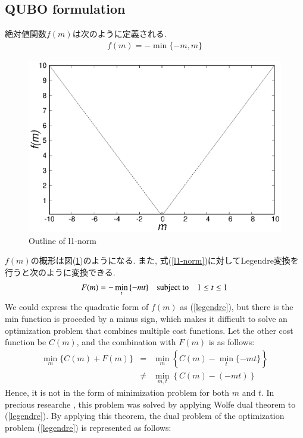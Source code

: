 \documentclass[fp,twocolumn]{jpsj3}
\begin{document}
\subsection{QUBO formulation}
絶対値関数$f(m)$は次のように定義される.
\begin{eqnarray}
  f(m)=-\min{\{-m,m\}} \label{l1-norm}
\end{eqnarray}
\begin{figure}[htbp]
  \begin{center}
    \includegraphics[keepaspectratio,scale=0.50]{absolute.eps}
    \caption{Outline of l1-norm}
    \label{fig:absolute}
  \end{center}
\end{figure}
$f(m)$の概形は図(\ref{fig:absolute})のようになる. また, 式(\ref{l1-norm})に対してLegendre変換を行うと次のように変換できる. 
\begin{eqnarray}
  F(m)=-\min_{t}{\{-mt\}} \quad \text{subject to} \quad \-1 \leq t \leq 1 \label{legendre}
\end{eqnarray}
We could express the quadratic form of $f(m)$ as (\ref{legendre}), but there is the min function is proceded by a minus sign, which makes it difficult to solve an optimization problem that combines multiple cost functions. Let the other cost function be $C(m)$, and the combination with $F(m)$ is as follows:
\begin{eqnarray}
  \min_{m}{\{C(m)+F(m)\}} &=& \min_{m}\left\{C(m)-\min_{t}{\{-mt\}}\right\} \nonumber \\
  &\neq & \min_{m,t}{\left\{C(m)-(-mt)\right\}} \nonumber 
\end{eqnarray}
Hence, it is not in the form of minimization problem for both $m$ and $t$.
In precious researche \cite{relu}, this problem was solved by applying Wolfe dual theorem to (\ref{legendre}). By applying this theorem, the dual problem of the optimization problem (\ref{legendre}) is represented as follows:
\end{document}
